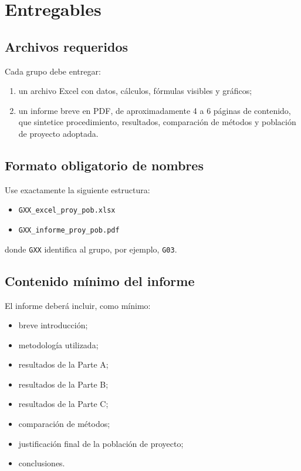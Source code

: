 \documentclass[12pt]{article}
\begin{document}
\section{Entregables}
\subsection{Archivos requeridos}
Cada grupo debe entregar:
\begin{enumerate}
\item un archivo Excel con datos, cálculos, fórmulas visibles y gráficos;
\item un informe breve en PDF, de aproximadamente 4 a 6 páginas de contenido, que sintetice procedimiento, resultados, comparación de métodos y población de proyecto adoptada.
\end{enumerate}

\subsection{Formato obligatorio de nombres}
Use exactamente la siguiente estructura:
\begin{itemize}
\item \texttt{GXX\_excel\_proy\_pob.xlsx}
\item \texttt{GXX\_informe\_proy\_pob.pdf}
\end{itemize}
donde \texttt{GXX} identifica al grupo, por ejemplo, \texttt{G03}.


\subsection{Contenido mínimo del informe}
El informe deberá incluir, como mínimo:
\begin{itemize}
\item breve introducción;
\item metodología utilizada;
\item resultados de la Parte A;
\item resultados de la Parte B;
\item resultados de la Parte C;
\item comparación de métodos;
\item justificación final de la población de proyecto;
\item conclusiones.
\end{itemize}
\end{document}

